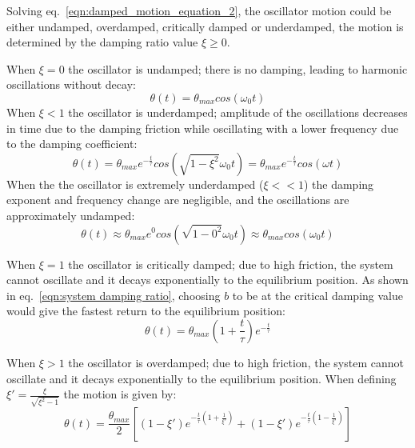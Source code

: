 \documentclass[\main/master.tex]{subfiles}
\begin{document}
\par\noindent
Solving eq.~\ref{eqn:damped_motion_equation_2}, the oscillator motion could be either undamped, overdamped, critically damped or underdamped, the motion is determined by the damping ratio value $\xi\geq 0$. 
\par\noindent
When $\xi = 0$ the oscillator is undamped; there is no damping, leading to harmonic oscillations without decay:
\begin{equation}
\theta(t) = \theta_{max}cos(\omega_0 t )    \label{eqn:undamped_motion_equation_2}
\end{equation}
When $\xi < 1$ the oscillator is underdamped; amplitude of the oscillations decreases in time due to the damping friction while oscillating with a lower frequency due to the damping coefficient: 
\begin{equation}
\theta(t) = \theta_{max} e^{-\frac{t}{\tau}}cos(\sqrt{1-\xi^2}\omega_0 t ) =  \theta_{max} e^{-\frac{t}{\tau}}cos(\omega t )    \label{eqn:underdamped_motion_equation}
\end{equation}
When the the oscillator is extremely underdamped ($\xi << 1$) the damping exponent and frequency change are negligible, and the oscillations are approximately undamped:
\begin{equation}
\theta(t) \approx   \theta_{max} e^{0}cos(\sqrt{1-0^2}\omega_0 t ) \approx \theta_{max}cos(\omega_0 t )   \label{eqn:extremely underdamped_motion_equation}
\end{equation}
\par\noindent
When $\xi = 1$ the oscillator is critically damped; due to high friction, the system cannot oscillate and it decays exponentially to the equilibrium position. As shown in eq.~\ref{eqn:system damping ratio}, choosing $b$ to be at the critical damping value would give the fastest return to the equilibrium position:
\begin{equation}
\theta(t) = \theta_{max}(1+\frac{t}{\tau}) e^{-\frac{t}{\tau}}     \label{eqn:critically_damped_motion_equation}
\end{equation}
\par\noindent
When $\xi > 1$ the oscillator is overdamped; due to high friction, the system cannot oscillate and it decays exponentially to the equilibrium position. When defining $\xi'  = \frac{\xi}{\sqrt{\xi^2 - 1}}$ the motion is given by: 
\begin{equation}
\theta(t) = \frac{\theta_{max}}{2} [ (1-\xi')e^{-\frac{t}{\tau}(1+\frac{1}{\xi'})} +(1-\xi')e^{-\frac{t}{\tau}(1-\frac{1}{\xi'})} ]
\label{eqn:overdamped_motion_equation}
\end{equation}
\end{document}
